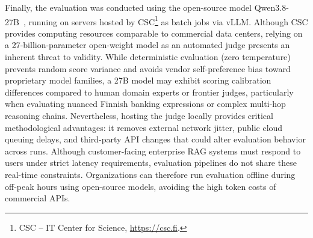 Finally, the evaluation was conducted using the open-source model Qwen3.8-27B~\citep{yang2025qwen3}, running on servers hosted by CSC\footnote{CSC -- IT Center for Science, \url{https://csc.fi}.} as batch jobs via vLLM. Although CSC provides computing resources comparable to commercial data centers, relying on a 27-billion-parameter open-weight model as an automated judge presents an inherent threat to validity. While deterministic evaluation (zero temperature) prevents random score variance and avoids vendor self-preference bias toward proprietary model families, a 27B model may exhibit scoring calibration differences compared to human domain experts or frontier judges, particularly when evaluating nuanced Finnish banking expressions or complex multi-hop reasoning chains. Nevertheless, hosting the judge locally provides critical methodological advantages: it removes external network jitter, public cloud queuing delays, and third-party API changes that could alter evaluation behavior across runs. Although customer-facing enterprise RAG systems must respond to users under strict latency requirements, evaluation pipelines do not share these real-time constraints. Organizations can therefore run evaluation offline during off-peak hours using open-source models, avoiding the high token costs of commercial APIs.

